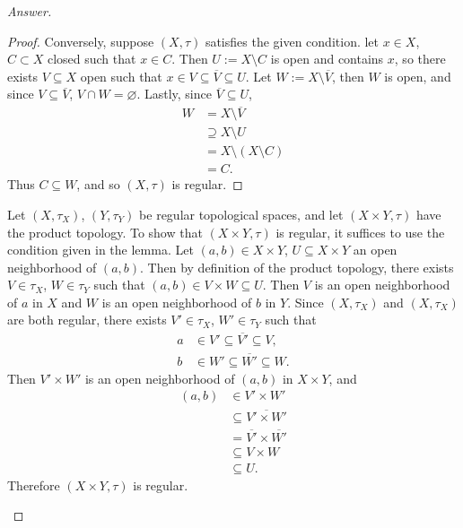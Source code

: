 \documentclass[12pt]{article}
\newcommand\paren[1]{\left( #1 \right)}
\theoremstyle{definition}
\begin{document}
\begin{proof}[Answer]
\begin{enumerate}[(i)]
\begin{proof}
            Conversely, suppose $(X,\tau)$ satisfies the given condition. let $x \in X$, $C \subset X$ closed such that $x \in C$. Then $U := X \setminus C$ is open and contains $x$, so there exists $V \subseteq X$ open such that $x \in V \subseteq \overline{V} \subseteq U$. Let $W := X \setminus \overline{V}$, then $W$ is open, and since $V \subseteq \overline{V}$, $V \cap W = \varnothing$. Lastly, since $\overline{V} \subseteq U$, 
            \begin{align*}
                W & = X \setminus \overline{V} \\
                & \supseteq X \setminus U \\
                & = X \setminus \paren{ X \setminus C } \\
                & = C.
            \end{align*}
            Thus $C \subseteq W$, and so $(X,\tau)$ is regular.
        \end{proof}
        Let $\paren{ X,\tau_X }$, $\paren{ Y,\tau_Y }$ be regular topological spaces, and let $(X \times Y , \tau)$ have the product topology. To show that $(X \times Y , \tau)$ is regular, it suffices to use the condition given in the lemma. Let $(a,b) \in X \times Y$, $U \subseteq X \times Y$ an open neighborhood of $(a,b)$. Then by definition of the product topology, there exists $V \in \tau_X$, $W \in \tau_Y$ such that $(a,b) \in V \times W \subseteq U$. Then $V$ is an open neighborhood of $a$ in $X$ and $W$ is an open neighborhood of $b$ in $Y$. Since $\paren{ X,\tau_X }$ and $\paren{ X,\tau_X }$ are both regular, there exists $V' \in \tau_X$, $W' \in \tau_Y$ such that 
        \begin{align*}
            a & \in V' \subseteq \overline{V'} \subseteq V, \\
            b & \in W' \subseteq \overline{W'} \subseteq W.
        \end{align*}
        Then $V' \times W'$ is an open neighborhood of $(a,b)$ in $X \times Y$, and 
        \begin{align*}
            (a,b) & \in V' \times W' \\
            & \subseteq \overline{ V' \times W' } \\
            & = \overline{V'} \times \overline{W'} \\
            & \subseteq V \times W \\
            & \subseteq U.
        \end{align*}
        Therefore $(X \times Y , \tau)$ is regular.
    \end{enumerate}
\end{proof}
\newpage
\end{document}

